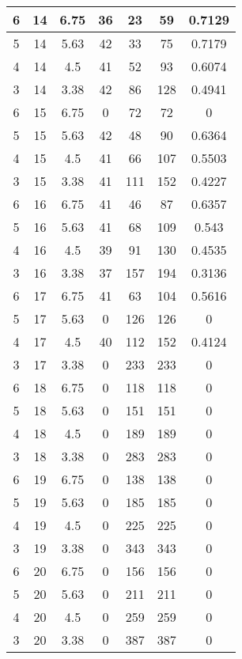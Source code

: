 \documentclass[letterpaper, 12pt]{article}
\begin{document}
\begin{longtable}{|c|c|c|c|c|c|c|}
\hline
6 & 14 & 6.75 & 36 & 23 & 59 & 0.7129 \\
\hline
5 & 14 & 5.63 & 42 & 33 & 75 & 0.7179 \\
\hline
4 & 14 & 4.5 & 41 & 52 & 93 & 0.6074 \\
\hline
3 & 14 & 3.38 & 42 & 86 & 128 & 0.4941 \\
\hline
6 & 15 & 6.75 & 0 & 72 & 72 & 0 \\
\hline
5 & 15 & 5.63 & 42 & 48 & 90 & 0.6364 \\
\hline
4 & 15 & 4.5 & 41 & 66 & 107 & 0.5503 \\
\hline
3 & 15 & 3.38 & 41 & 111 & 152 & 0.4227 \\
\hline
6 & 16 & 6.75 & 41 & 46 & 87 & 0.6357 \\
\hline
5 & 16 & 5.63 & 41 & 68 & 109 & 0.543 \\
\hline
4 & 16 & 4.5 & 39 & 91 & 130 & 0.4535 \\
\hline
3 & 16 & 3.38 & 37 & 157 & 194 & 0.3136 \\
\hline
6 & 17 & 6.75 & 41 & 63 & 104 & 0.5616 \\
\hline
5 & 17 & 5.63 & 0 & 126 & 126 & 0 \\
\hline
4 & 17 & 4.5 & 40 & 112 & 152 & 0.4124 \\
\hline
3 & 17 & 3.38 & 0 & 233 & 233 & 0 \\
\hline
6 & 18 & 6.75 & 0 & 118 & 118 & 0 \\
\hline
5 & 18 & 5.63 & 0 & 151 & 151 & 0 \\
\hline
4 & 18 & 4.5 & 0 & 189 & 189 & 0 \\
\hline
3 & 18 & 3.38 & 0 & 283 & 283 & 0 \\
\hline
6 & 19 & 6.75 & 0 & 138 & 138 & 0 \\
\hline
5 & 19 & 5.63 & 0 & 185 & 185 & 0 \\
\hline
4 & 19 & 4.5 & 0 & 225 & 225 & 0 \\
\hline
3 & 19 & 3.38 & 0 & 343 & 343 & 0 \\
\hline
6 & 20 & 6.75 & 0 & 156 & 156 & 0 \\
\hline
5 & 20 & 5.63 & 0 & 211 & 211 & 0 \\
\hline
4 & 20 & 4.5 & 0 & 259 & 259 & 0 \\
\hline
3 & 20 & 3.38 & 0 & 387 & 387 & 0 \\
\hline
\end{longtable}
\end{document}
